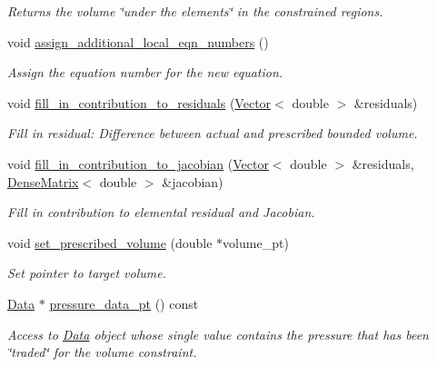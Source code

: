 \begin{DoxyCompactItemize}
\begin{DoxyCompactList}\small\item\em Returns the volume \char`\"{}under the elements\char`\"{} in the constrained regions. \end{DoxyCompactList}\item 
void \hyperlink{classoomph_1_1FoepplvonKarmanVolumeConstraintElement_ab8879fad1a0804054520a2d7a57d940b}{assign\+\_\+additional\+\_\+local\+\_\+eqn\+\_\+numbers} ()
\begin{DoxyCompactList}\small\item\em Assign the equation number for the new equation. \end{DoxyCompactList}\item 
void \hyperlink{classoomph_1_1FoepplvonKarmanVolumeConstraintElement_a670a824ff37ac6b77f9230184f4bb9f4}{fill\+\_\+in\+\_\+contribution\+\_\+to\+\_\+residuals} (\hyperlink{classoomph_1_1Vector}{Vector}$<$ double $>$ \&residuals)
\begin{DoxyCompactList}\small\item\em Fill in residual\+: Difference between actual and prescribed bounded volume. \end{DoxyCompactList}\item 
void \hyperlink{classoomph_1_1FoepplvonKarmanVolumeConstraintElement_a3763adc00373350071bef1dea329f94d}{fill\+\_\+in\+\_\+contribution\+\_\+to\+\_\+jacobian} (\hyperlink{classoomph_1_1Vector}{Vector}$<$ double $>$ \&residuals, \hyperlink{classoomph_1_1DenseMatrix}{Dense\+Matrix}$<$ double $>$ \&jacobian)
\begin{DoxyCompactList}\small\item\em Fill in contribution to elemental residual and Jacobian. \end{DoxyCompactList}\item 
void \hyperlink{classoomph_1_1FoepplvonKarmanVolumeConstraintElement_a91f7e77ffeaf09914838d9af945c2c56}{set\+\_\+prescribed\+\_\+volume} (double $\ast$volume\+\_\+pt)
\begin{DoxyCompactList}\small\item\em Set pointer to target volume. \end{DoxyCompactList}\item 
\hyperlink{classoomph_1_1Data}{Data} $\ast$ \hyperlink{classoomph_1_1FoepplvonKarmanVolumeConstraintElement_a092ba84924e8389c573eb232d3ec640c}{pressure\+\_\+data\+\_\+pt} () const
\begin{DoxyCompactList}\small\item\em Access to \hyperlink{classoomph_1_1Data}{Data} object whose single value contains the pressure that has been \char`\"{}traded\char`\"{} for the volume constraint. \end{DoxyCompactList}\end{DoxyCompactItemize}
